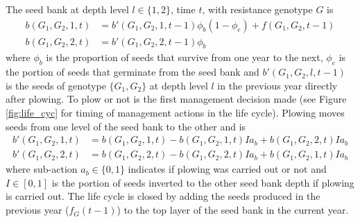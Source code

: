 \documentclass[12pt, a4paper]{article}
\begin{document}
The seed bank at depth level $l \in \{1, 2\}$, time $t$, with resistance genotype $G$ is 
\begin{subequations}
\label{eq:sb}
\begin{align}
	b(G_1, G_2, 1, t) &= b'(G_1, G_2, 1, t - 1)\phi_b (1 - \phi_e) + f(G_1, G_2, t-1)\\
	b(G_1, G_2, 2, t) &= b'(G_1, G_2, 2, t - 1)\phi_b	 
\end{align}      
\end{subequations} 
where $\phi_b$ is the proportion of seeds that survive from one year to the next, $\phi_e$ is the portion of seeds that germinate from the seed bank and $b'(G_1, G_2, l, t - 1)$ is the seeds of genotype $\{G_1, G_2\}$ at depth level $l$ in the previous year directly after plowing. To plow or not is the first management decision made (see Figure \ref{fig:life_cyc} for timing of management actions in the life cycle). Plowing moves seeds from one level of the seed bank to the other and is
\begin{subequations}
\label{eq:sb_pp}
\begin{align}
	b'(G_1, G_2, 1, t) &= b(G_1, G_2, 1, t) - b(G_1, G_2, 1, t) I a_b + b(G_1, G_2, 2, t) I a_b \\
	b'(G_1, G_2, 2, t) &= b(G_1, G_2, 2, t) - b(G_1, G_2, 2, t) I a_b + b(G_1, G_2, 1, t) I a_b
\end{align}
\end{subequations} 
where sub-action $a_b \in \{0, 1\}$ indicates if plowing was carried out or not and $I \in [0, 1]$ is the portion of seeds inverted to the other seed bank depth if plowing is carried out. The life cycle is closed by adding the seeds produced in the previous year ($f_G(t - 1)$) to the top layer of the seed bank in the current year.
\end{document}
